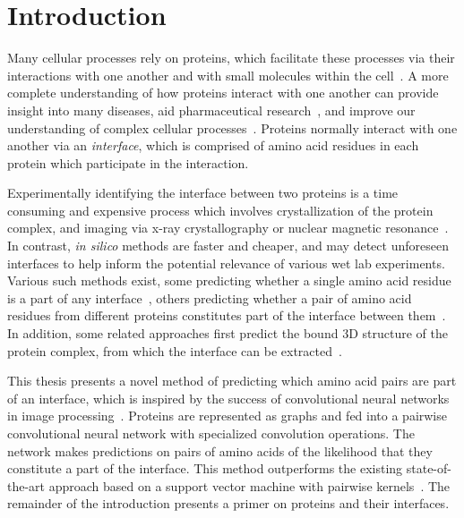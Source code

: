 

\chapter{Introduction}
\label{chap:intro}

Many cellular processes rely on proteins, which facilitate these processes via their interactions with one another and with small molecules within the cell~\cite{scheeffink2003}.
A more complete understanding of how proteins interact with one another can provide insight into many diseases, aid pharmaceutical research~\cite{fauman2003}, and improve our understanding of complex cellular processes~\cite{altman2003}.
Proteins normally interact with one another via an \textit{interface}, which is comprised of amino acid residues in each protein which participate in the interaction.

Experimentally identifying the interface between two proteins is a time consuming and expensive process which involves crystallization of the protein complex, and imaging via x-ray crystallography or nuclear magnetic resonance~\cite{bijelic2017}\cite{ilarisavino2017}\cite{wang2017}.
In contrast, \textit{in silico} methods are faster and cheaper, and may detect unforeseen interfaces to help inform the potential relevance of various wet lab experiments.
Various such methods exist, some predicting whether a single amino acid residue is a part of any interface~\cite{}, others predicting whether a pair of amino acid residues from different proteins constitutes part of the interface between them~\cite{ahmad2011}\cite{minhas2014}.
In addition, some related approaches first predict the bound 3D structure of the protein complex, from which the interface can be extracted~\cite{chen2003}\cite{dominguez2003}.

This thesis presents a novel method of predicting which amino acid pairs are part of an interface, which is inspired by the success of convolutional neural networks in image processing~\cite{gu2015}\cite{lecun2010}.
Proteins are represented as graphs and fed into a pairwise convolutional neural network with specialized convolution operations.
The network makes predictions on pairs of amino acids of the likelihood that they constitute a part of the interface. 
This method outperforms the existing state-of-the-art approach based on a support vector machine with pairwise kernels~\cite{minhas2014}.
The remainder of the introduction presents a primer on proteins and their interfaces. 

